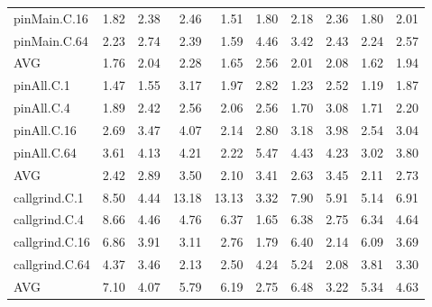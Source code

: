 \begin{table*}[]
\begin{center}
\begin{tabular}{lrrrrrrrrr}
 pinMain.C.16   & 1.82 & 2.38 &  2.46 &  1.51 & 1.80 & 2.18 & 2.36 & 1.80 & 2.01 \\
 pinMain.C.64   & 2.23 & 2.74 &  2.39 &  1.59 & 4.46 & 3.42 & 2.43 & 2.24 & 2.57 \\
 AVG            & 1.76 & 2.04 &  2.28 &  1.65 & 2.56 & 2.01 & 2.08 & 1.62 & 1.94 \\
 pinAll.C.1     & 1.47 & 1.55 &  3.17 &  1.97 & 2.82 & 1.23 & 2.52 & 1.19 & 1.87 \\
 pinAll.C.4     & 1.89 & 2.42 &  2.56 &  2.06 & 2.56 & 1.70 & 3.08 & 1.71 & 2.20 \\
 pinAll.C.16    & 2.69 & 3.47 &  4.07 &  2.14 & 2.80 & 3.18 & 3.98 & 2.54 & 3.04 \\
 pinAll.C.64    & 3.61 & 4.13 &  4.21 &  2.22 & 5.47 & 4.43 & 4.23 & 3.02 & 3.80 \\
 AVG            & 2.42 & 2.89 &  3.50 &  2.10 & 3.41 & 2.63 & 3.45 & 2.11 & 2.73 \\
 callgrind.C.1  & 8.50 & 4.44 & 13.18 & 13.13 & 3.32 & 7.90 & 5.91 & 5.14 & 6.91 \\
 callgrind.C.4  & 8.66 & 4.46 &  4.76 &  6.37 & 1.65 & 6.38 & 2.75 & 6.34 & 4.64 \\
 callgrind.C.16 & 6.86 & 3.91 &  3.11 &  2.76 & 1.79 & 6.40 & 2.14 & 6.09 & 3.69 \\
 callgrind.C.64 & 4.37 & 3.46 &  2.13 &  2.50 & 4.24 & 5.24 & 2.08 & 3.81 & 3.30 \\
 AVG            & 7.10 & 4.07 &  5.79 &  6.19 & 2.75 & 6.48 & 3.22 & 5.34 & 4.63 \\
\hline
\end{tabular}
\end{center}
\end{table*}
